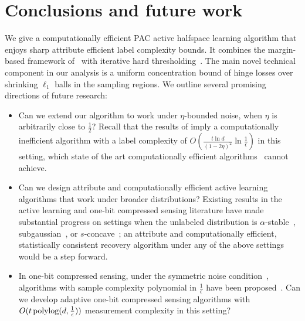 \section{Conclusions and future work}

We give a computationally efficient PAC active halfspace learning algorithm that enjoys sharp attribute efficient label complexity bounds.
It combines the margin-based framework of~\cite{BBZ07,BL13} with iterative hard thresholding~\citep{BD09, GK09}.
The main novel technical component in our analysis is a uniform concentration bound of hinge losses over shrinking $\ell_1$ balls in the sampling regions.
We outline several promising directions of future research:
\begin{itemize}
\item Can we extend our algorithm to work under $\eta$-bounded noise, when $\eta$ is arbitrarily close to $\frac 1 2$? Recall that the results of \cite{ZC14}
imply a computationally inefficient algorithm with a label complexity of $O(\frac{t \ln d}{(1-2\eta)^2} \ln \frac 1 \epsilon)$ in this setting,
which state of the art computationally efficient algorithms~\citep[e.g.][]{ABHZ16} cannot achieve.

\item Can we design attribute and computationally efficient active learning algorithms that work under broader distributions? Existing results in the active learning and one-bit compressed sensing literature have made substantial progress on settings when the unlabeled distribution is $\alpha$-stable~\citep{L16}, subgaussian~\citep{ALPV14, CB15}, or $s$-concave~\citep{BZ17}; an attribute and computationally efficient, statistically consistent recovery algorithm under any of the above settings would be a step forward.


\item In one-bit compressed sensing, under the symmetric noise condition~\citep{PV13b}, algorithms with sample complexity polynomial in $\frac 1 \epsilon$ have been proposed~\citep{PV13b, ZYJ14, ZG15}.
Can we develop adaptive one-bit compressed sensing algorithms with $O(t \operatorname{polylog}(d,\frac 1 \epsilon))$ measurement complexity in this setting?
\end{itemize}
